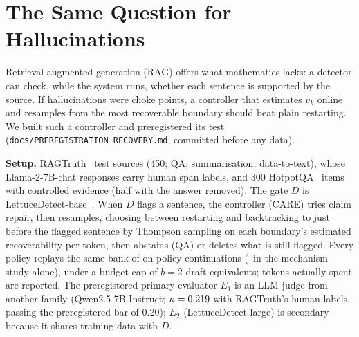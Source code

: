 \section{The Same Question for Hallucinations}\label{sec:grounded}
Retrieval-augmented generation (RAG) offers what mathematics lacks: a detector can check, while the
system runs, whether each sentence is supported by the source. If hallucinations were choke points,
a controller that estimates $v_k$ online and resamples from the most recoverable boundary should
beat plain restarting. We built such a controller and preregistered its test
(\texttt{docs/PREREGISTRATION\_RECOVERY.md}, committed before any data).

\textbf{Setup.} RAGTruth~\cite{ragtruth} test sources (450; QA, summarisation, data-to-text), whose
Llama-2-7B-chat responses carry human span labels, and 300 HotpotQA~\cite{yang2018hotpotqa}
items with controlled evidence (half with the answer removed). The gate $D$ is LettuceDetect-base~\cite{lettucedetect}.
When $D$ flags a sentence, the controller (CARE) tries claim repair, then resamples, choosing
between restarting and backtracking to just before the flagged sentence by Thompson sampling on
each boundary's estimated recoverability per token, then abstains (QA) or deletes what is still
flagged. Every policy replays the same bank of on-policy continuations (\mechCont\ in the mechanism
study alone), under a budget cap of $b=2$ draft-equivalents; tokens actually spent are reported.
The preregistered primary evaluator $E_1$ is an LLM judge from another family (Qwen2.5-7B-Instruct;
$\kappa=0.219$ with RAGTruth's human labels, passing the preregistered bar of 0.20); $E_2$
(LettuceDetect-large) is secondary because it shares training data with $D$.

